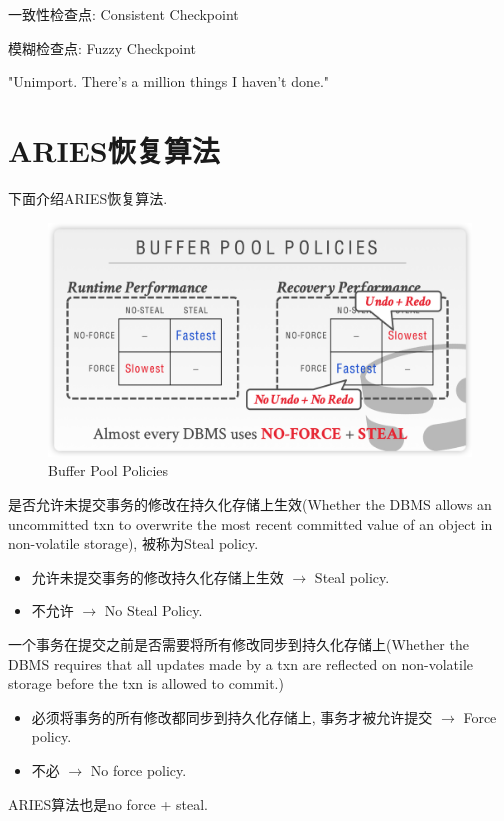 一致性检查点: Consistent Checkpoint

模糊检查点: Fuzzy Checkpoint

"Unimport. There's a million things I haven't done."


\section{ARIES恢复算法}

下面介绍ARIES恢复算法\cite{10.1145/128765.128770}.

\begin{figure}[H]
    \centering
    \includegraphics[width=.7\textwidth]{figure/policies.png}
    \caption{Buffer Pool Policies}
\end{figure}


\begin{definition}
是否允许未提交事务的修改在持久化存储上生效(Whether the DBMS allows an uncommitted txn to overwrite the most recent committed value of an object in non-volatile storage), 被称为Steal policy.
\begin{itemize}
    \item 允许未提交事务的修改持久化存储上生效 $\to$ Steal policy.
    \item 不允许 $\to$ No Steal Policy.
\end{itemize}
\end{definition}

\begin{definition}
一个事务在提交之前是否需要将所有修改同步到持久化存储上(Whether the DBMS requires that all updates made by a txn are reflected on non-volatile storage before the txn is allowed to commit.)
\begin{itemize}
    \item 必须将事务的所有修改都同步到持久化存储上, 事务才被允许提交 $\to$ Force policy.
    \item 不必 $\to$ No force policy.
\end{itemize}
\end{definition}

ARIES算法也是no force + steal.


